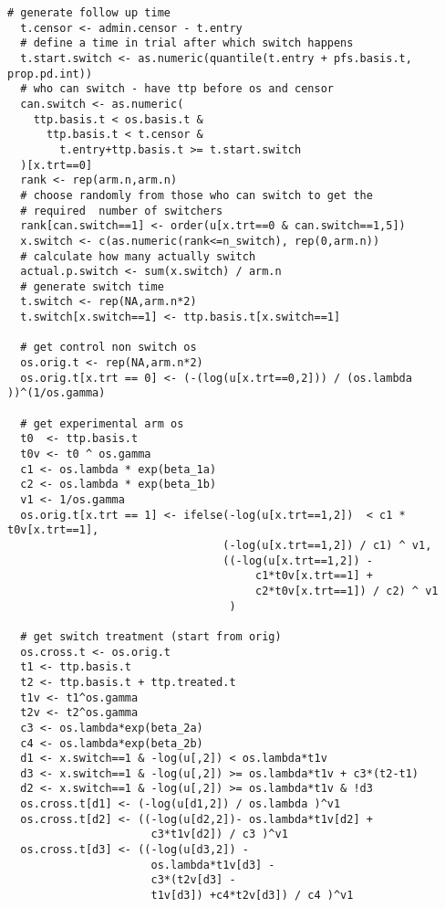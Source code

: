 \begin{Verbatim}[fontsize=\small, baselinestretch=0.75]
  # generate follow up time
  t.censor <- admin.censor - t.entry
  # define a time in trial after which switch happens
  t.start.switch <- as.numeric(quantile(t.entry + pfs.basis.t, prop.pd.int))
  # who can switch - have ttp before os and censor
  can.switch <- as.numeric(
    ttp.basis.t < os.basis.t &
      ttp.basis.t < t.censor &
        t.entry+ttp.basis.t >= t.start.switch
  )[x.trt==0]  
  rank <- rep(arm.n,arm.n)
  # choose randomly from those who can switch to get the
  # required  number of switchers
  rank[can.switch==1] <- order(u[x.trt==0 & can.switch==1,5])
  x.switch <- c(as.numeric(rank<=n_switch), rep(0,arm.n))
  # calculate how many actually switch 
  actual.p.switch <- sum(x.switch) / arm.n
  # generate switch time
  t.switch <- rep(NA,arm.n*2)
  t.switch[x.switch==1] <- ttp.basis.t[x.switch==1]
  
  # get control non switch os
  os.orig.t <- rep(NA,arm.n*2)
  os.orig.t[x.trt == 0] <- (-(log(u[x.trt==0,2])) / (os.lambda ))^(1/os.gamma)
  
  # get experimental arm os
  t0  <- ttp.basis.t 
  t0v <- t0 ^ os.gamma
  c1 <- os.lambda * exp(beta_1a)
  c2 <- os.lambda * exp(beta_1b)
  v1 <- 1/os.gamma
  os.orig.t[x.trt == 1] <- ifelse(-log(u[x.trt==1,2])  < c1 * t0v[x.trt==1],
                                 (-log(u[x.trt==1,2]) / c1) ^ v1,
                                 ((-log(u[x.trt==1,2]) -
                                      c1*t0v[x.trt==1] + 
                                      c2*t0v[x.trt==1]) / c2) ^ v1
                                  )

  # get switch treatment (start from orig)
  os.cross.t <- os.orig.t
  t1 <- ttp.basis.t
  t2 <- ttp.basis.t + ttp.treated.t
  t1v <- t1^os.gamma
  t2v <- t2^os.gamma
  c3 <- os.lambda*exp(beta_2a)
  c4 <- os.lambda*exp(beta_2b)
  d1 <- x.switch==1 & -log(u[,2]) < os.lambda*t1v
  d3 <- x.switch==1 & -log(u[,2]) >= os.lambda*t1v + c3*(t2-t1)
  d2 <- x.switch==1 & -log(u[,2]) >= os.lambda*t1v & !d3
  os.cross.t[d1] <- (-log(u[d1,2]) / os.lambda )^v1
  os.cross.t[d2] <- ((-log(u[d2,2])- os.lambda*t1v[d2] + 
                      c3*t1v[d2]) / c3 )^v1
  os.cross.t[d3] <- ((-log(u[d3,2]) -
                      os.lambda*t1v[d3] - 
                      c3*(t2v[d3] - 
                      t1v[d3]) +c4*t2v[d3]) / c4 )^v1
  

\end{Verbatim}
